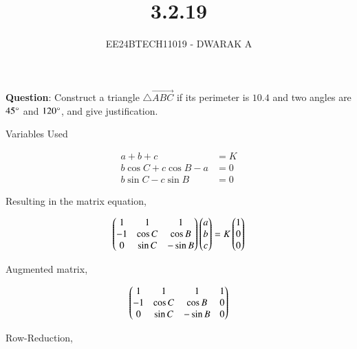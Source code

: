 \documentclass[journal]{IEEEtran}
\begin{document}

\vspace{3cm}

\title{3.2.19}
\author{EE24BTECH11019 - DWARAK A}
{\let\newpage\relax\maketitle}

\renewcommand{\thefigure}{\theenumi}
\renewcommand{\thetable}{\theenumi}
\setlength{\intextsep}{10pt} %


\renewcommand{\thetable}{\theenumi}


\textbf{Question}:
Construct a triangle $\triangle\vec{ABC}$ if its perimeter is $10.4$ and two angles are $45\degree$ and $120\degree$, and give justification.

\solution
\begin{table}[h!]    
  \centering
  
  \caption{Variables Used}
  \label{tab3.2.19.1}
\end{table}

\begin{align}
    a+b+c&=K \\
    b\cos{C}+c\cos{B}-a&=0 \\
    b\sin{C}-c\sin{B}&=0
\end{align}

Resulting in the matrix equation,

\begin{align}
    \begin{pmatrix}1&1&1\\-1&\cos{C}&\cos{B}\\0&\sin{C}&-\sin{B}\end{pmatrix}\begin{pmatrix}a\\b\\c\end{pmatrix}=K\begin{pmatrix}1\\0\\0\end{pmatrix}
\end{align}

Augmented matrix,

\begin{align}
    \begin{pmatrix}1&1&1&1\\-1&\cos{C}&\cos{B}&0\\0&\sin{C}&-\sin{B}&0\end{pmatrix}
\end{align}

Row-Reduction,
\end{document}
